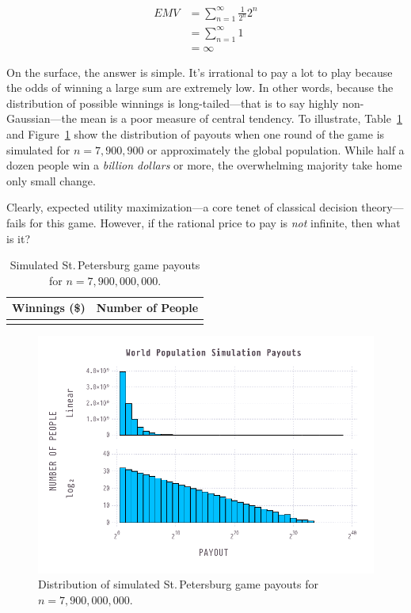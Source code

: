 \documentclass[11pt]{article}
\begin{document}
\begin{align}
\label{eq:1}
  EMV &= \sum_{n=1}^{\infty} \frac{1}{2^{n}}2^n \\
      &= \sum_{n=1}^{\infty}1 \\
      &= \infty
\end{align}

On the surface, the answer is simple. It's irrational to pay a lot to play because the odds of winning a large sum are extremely low. In other words, because the distribution of possible winnings is long-tailed---that is to say highly non-Gaussian---the mean is a poor measure of central tendency. To illustrate, Table~\ref{tab:world} and Figure~\ref{fig:world} show the distribution of payouts when one round of the game is simulated for $n=7,900,900$ or approximately the global population. While half a dozen people win a \textit{billion dollars} or more, the overwhelming majority take home only small change.

Clearly, expected utility maximization---a core tenet of classical decision theory---fails for this game. However, if the rational price to pay is \textit{not} infinite, then what is it?

\begin{table}
  \centering
  \begin{tabular}{cc}
    \toprule
    \textbf{Winnings (\$)} & \textbf{Number of People} \\
    \midrule
     \\
    \bottomrule
  \end{tabular}
  \caption{Simulated St.\,Petersburg game payouts for $n=7,900,000,000$.}
  \label{tab:world}
\end{table}

\begin{figure}
  \centering
  \includegraphics[width=\textwidth]{world}
  \caption{Distribution of simulated St.\,Petersburg game payouts for $n=7,900,000,000$.}
  \label{fig:world}
\end{figure}
\end{document}
